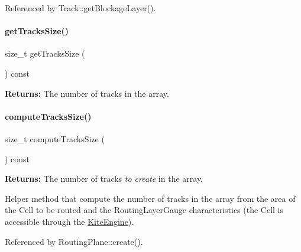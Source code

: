 Referenced by Track\+::get\+Blockage\+Layer().

\mbox{\label{classKite_1_1RoutingPlane_aa44eb6d4806e49d36bf273cd9d979197}} 
\paragraph{\texorpdfstring{get\+Tracks\+Size()}{getTracksSize()}}
{\footnotesize\ttfamily size\+\_\+t get\+Tracks\+Size (\begin{DoxyParamCaption}{ }\end{DoxyParamCaption}) const\hspace{0.3cm}{\ttfamily [inline]}}

{\bfseries Returns\+:} The number of tracks in the array. \mbox{\label{classKite_1_1RoutingPlane_a4b4c6bb50297d585962d84b2a165e139}} 
\paragraph{\texorpdfstring{compute\+Tracks\+Size()}{computeTracksSize()}}
{\footnotesize\ttfamily size\+\_\+t compute\+Tracks\+Size (\begin{DoxyParamCaption}{ }\end{DoxyParamCaption}) const\hspace{0.3cm}{\ttfamily [inline]}}

{\bfseries Returns\+:} The number of tracks {\itshape to create} in the array.

Helper method that compute the number of tracks in the array from the area of the Cell to be routed and the Routing\+Layer\+Gauge characteristics (the Cell is accessible through the \mbox{\hyperlink{classKite_1_1KiteEngine}{Kite\+Engine}}). 

Referenced by Routing\+Plane\+::create().

\mbox{\label{classKite_1_1RoutingPlane_ae2ea9830bfcd3d7f36af63bcad3eed6e}} 
